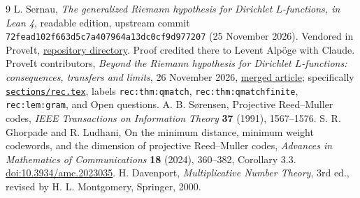 \documentclass[11pt]{article}
\theoremstyle{definition}\newtheorem{definition}[theorem]{Definition}
\theoremstyle{remark}\newtheorem{remark}[theorem]{Remark}
\begin{document}
\begin{thebibliography}{9}
 L. Sernau, \emph{The generalized Riemann hypothesis for Dirichlet $L$-functions, in Lean 4}, readable edition, upstream commit \texttt{72fead102f663d5c7a407964a13dc0cf9d977207} (25 November 2026). Vendored in ProveIt, \href{https://github.com/VladimirReshetnikov/ProveIt/tree/main/Analysis/GeneralizedRiemannHypothesis/vendor/grh-lean}{repository directory}. Proof credited there to Levent Alp\"oge with Claude.
 ProveIt contributors, \emph{Beyond the Riemann hypothesis for Dirichlet $L$-functions: consequences, transfers and limits}, 26 November 2026, \href{https://github.com/VladimirReshetnikov/ProveIt/tree/main/Analysis/GeneralizedRiemannHypothesis/Article}{merged article}; specifically \href{https://github.com/VladimirReshetnikov/ProveIt/blob/main/Analysis/GeneralizedRiemannHypothesis/Article/sections/rec.tex}{\texttt{sections/rec.tex}}, labels \texttt{rec:thm:qmatch}, \texttt{rec:thm:qmatchfinite}, \texttt{rec:lem:gram}, and Open questions.
 A. B. S\o rensen, Projective Reed--Muller codes, \emph{IEEE Transactions on Information Theory} \textbf{37} (1991), 1567--1576.
 S. R. Ghorpade and R. Ludhani, On the minimum distance, minimum weight codewords, and the dimension of projective Reed--Muller codes, \emph{Advances in Mathematics of Communications} \textbf{18} (2024), 360--382, Corollary 3.3. \href{https://doi.org/10.3934/amc.2023035}{doi:10.3934/amc.2023035}.
 H. Davenport, \emph{Multiplicative Number Theory}, 3rd ed., revised by H. L. Montgomery, Springer, 2000.
\end{thebibliography}
\end{document}
